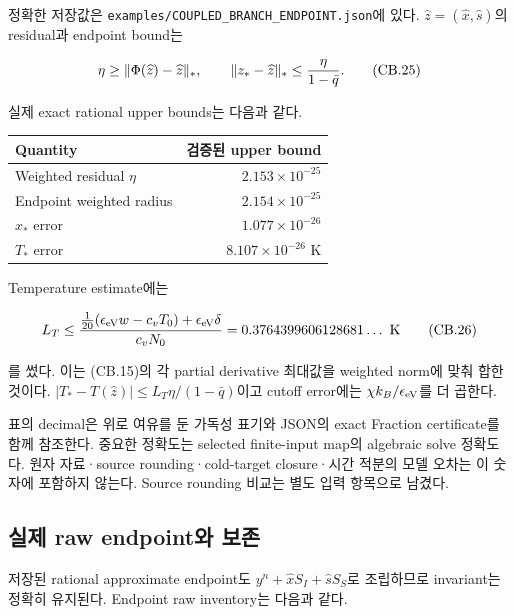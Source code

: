 정확한 저장값은 \nolinkurl{examples/COUPLED_BRANCH_ENDPOINT.json}에 있다. \(\widehat z=(\widehat x,\widehat s)\)의 residual과 endpoint bound는

\[
 \eta\ge\|\Phi(\widehat z)-\widehat z\|_*,\qquad
 \|z_*-\widehat z\|_*\le{\eta\over1-\bar q}.
 \tag{CB.25}
\]

실제 exact rational upper bounds는 다음과 같다.

\begin{longtable}[]{@{}lr@{}}
\toprule\noalign{}
Quantity & 검증된 upper bound \\
\midrule\noalign{}
\endhead
\bottomrule\noalign{}
\endlastfoot
Weighted residual \(\eta\) & \(2.153\times10^{-25}\) \\
Endpoint weighted radius & \(2.154\times10^{-25}\) \\
\(x_*\) error & \(1.077\times10^{-26}\) \\
\(T_*\) error & \(8.107\times10^{-26}\) K \\
\end{longtable}

Temperature estimate에는

\[
 L_T\le {\frac1{20}(\epsilon_{\rm eV}w-c_vT_0)
                 +\epsilon_{\rm eV}\delta\over c_vN_0}
      =0.3764399606128681\ldots\ {\rm K}
 \tag{CB.26}
\]

를 썼다. 이는 (CB.15)의 각 partial derivative 최대값을 weighted norm에 맞춰 합한 것이다. \(|T_*-T(\widehat z)|\le L_T\eta/(1-\bar q)\)이고 cutoff error에는 \(\chi k_B/\epsilon_{\rm eV}\)를 더 곱한다.

표의 decimal은 위로 여유를 둔 가독성 표기와 JSON의 exact Fraction certificate를 함께 참조한다. 중요한 정확도는 selected finite-input map의 algebraic solve 정확도다. 원자 자료·source rounding·cold-target closure·시간 적분의 모델 오차는 이 숫자에 포함하지 않는다. Source rounding 비교는 별도 입력 항목으로 남겼다.

\hypertarget{uxc2e4uxc81c-raw-endpointuxc640-uxbcf4uxc874}{%
\subsection{실제 raw endpoint와 보존}\label{uxc2e4uxc81c-raw-endpointuxc640-uxbcf4uxc874}}

저장된 rational approximate endpoint도 \(y^n+\widehat xS_I+\widehat sS_S\)로 조립하므로 invariant는 정확히 유지된다. Endpoint raw inventory는 다음과 같다.

